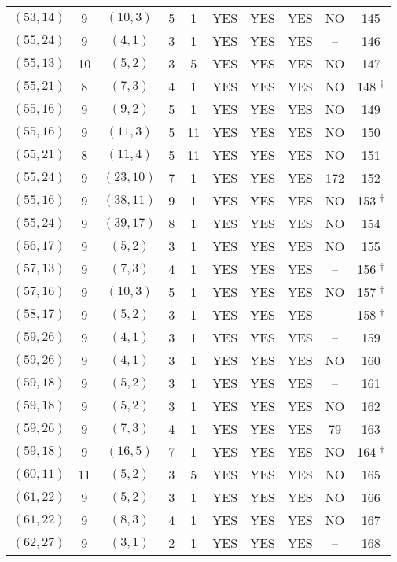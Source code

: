 \begin{longtable}{|c|c|c|c|c|c|c|c|c|c|}
$(53, 14)$ & 9 & $(10, 3)$ & 5 & 1 & YES & YES & YES & NO & 145\\
$(55, 24)$ & 9 & $(4, 1)$ & 3 & 1 & YES & YES & YES & -- & 146\\
$(55, 13)$ & 10 & $(5, 2)$ & 3 & 5 & YES & YES & YES & NO & 147\\
$(55, 21)$ & 8 & $(7, 3)$ & 4 & 1 & YES & YES & YES & NO & 148 ${}^\dagger$\\
$(55, 16)$ & 9 & $(9, 2)$ & 5 & 1 & YES & YES & YES & NO & 149\\
$(55, 16)$ & 9 & $(11, 3)$ & 5 & 11 & YES & YES & YES & NO & 150\\
$(55, 21)$ & 8 & $(11, 4)$ & 5 & 11 & YES & YES & YES & NO & 151\\
$(55, 24)$ & 9 & $(23, 10)$ & 7 & 1 & YES & YES & YES & 172 & 152\\
$(55, 16)$ & 9 & $(38, 11)$ & 9 & 1 & YES & YES & YES & NO & 153 ${}^\dagger$\\
$(55, 24)$ & 9 & $(39, 17)$ & 8 & 1 & YES & YES & YES & NO & 154\\
$(56, 17)$ & 9 & $(5, 2)$ & 3 & 1 & YES & YES & YES & NO & 155\\
$(57, 13)$ & 9 & $(7, 3)$ & 4 & 1 & YES & YES & YES & -- & 156 ${}^\dagger$\\
$(57, 16)$ & 9 & $(10, 3)$ & 5 & 1 & YES & YES & YES & NO & 157 ${}^\dagger$\\
$(58, 17)$ & 9 & $(5, 2)$ & 3 & 1 & YES & YES & YES & -- & 158 ${}^\dagger$\\
$(59, 26)$ & 9 & $(4, 1)$ & 3 & 1 & YES & YES & YES & -- & 159\\
$(59, 26)$ & 9 & $(4, 1)$ & 3 & 1 & YES & YES & YES & NO & 160\\
$(59, 18)$ & 9 & $(5, 2)$ & 3 & 1 & YES & YES & YES & -- & 161\\
$(59, 18)$ & 9 & $(5, 2)$ & 3 & 1 & YES & YES & YES & NO & 162\\
$(59, 26)$ & 9 & $(7, 3)$ & 4 & 1 & YES & YES & YES & 79 & 163\\
$(59, 18)$ & 9 & $(16, 5)$ & 7 & 1 & YES & YES & YES & NO & 164 ${}^\dagger$\\
$(60, 11)$ & 11 & $(5, 2)$ & 3 & 5 & YES & YES & YES & NO & 165\\
$(61, 22)$ & 9 & $(5, 2)$ & 3 & 1 & YES & YES & YES & NO & 166\\
$(61, 22)$ & 9 & $(8, 3)$ & 4 & 1 & YES & YES & YES & NO & 167\\
$(62, 27)$ & 9 & $(3, 1)$ & 2 & 1 & YES & YES & YES & -- & 168\\

\end{longtable}
